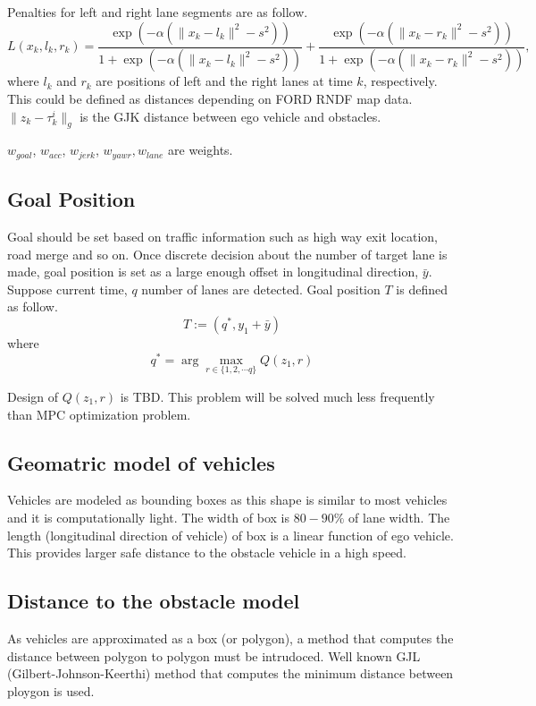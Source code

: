 \documentclass[12pt]{article}
\begin{document}
Penalties for left and right lane segments are as follow.
\begin{equation}
\label{penalty}
L(x_k,l_k,r_k) = \frac{\exp(-\alpha(\|x_k-l_k\|^2-s^2))}{1+\exp(-\alpha(\|x_k-l_k\|^2-s^2))} + \frac{\exp(-\alpha(\|x_k-r_k\|^2-s^2))}{1+\exp(-\alpha(\|x_k-r_k\|^2-s^2))},
\end{equation}
where
$l_k$ and $r_k$ are positions of left and the right lanes at time $k$, respectively. This could be defined as distances depending on FORD RNDF map data. $\|z_k-\tau^i_k \|_g$ is the GJK distance between ego vehicle and obstacles.
 
$w_{goal}$, $w_{acc}$, $w_{jerk}$, $w_{yawr}, w_{lane}$ are weights.


\subsection*{Goal Position}
Goal should be set based on traffic information such as high way exit location, road merge and so on. Once discrete decision about the number of target lane is made, goal position is set as a large enough offset in longitudinal direction, $\bar{y}$. Suppose current time, $q$ number of lanes are detected. Goal position $T$ is defined as follow.
\begin{equation}
T:=(q^*,y_1+\bar{y})
\end{equation}
where
\begin{equation}
q^*=\arg\max_{r \in \{1,2,\cdots q \}}Q(z_1,r)
\end{equation}

Design of $Q(z_1,r)$ is TBD. This problem will be solved much less frequently than MPC optimization problem.

\subsection*{Geomatric model of vehicles}
Vehicles are modeled as bounding boxes as this shape is similar to most vehicles and it is computationally light. The width of box is $80-90\%$ of lane width. The length (longitudinal direction of vehicle) of box is a linear function of ego vehicle. This provides larger safe distance to the obstacle vehicle in a high speed.

\subsection*{Distance to the obstacle model}
As vehicles are approximated as a box (or polygon), a method that computes the distance between polygon to polygon must be intrudoced. Well known GJL (Gilbert-Johnson-Keerthi) method that computes the minimum distance between ploygon is used.
\end{document}
